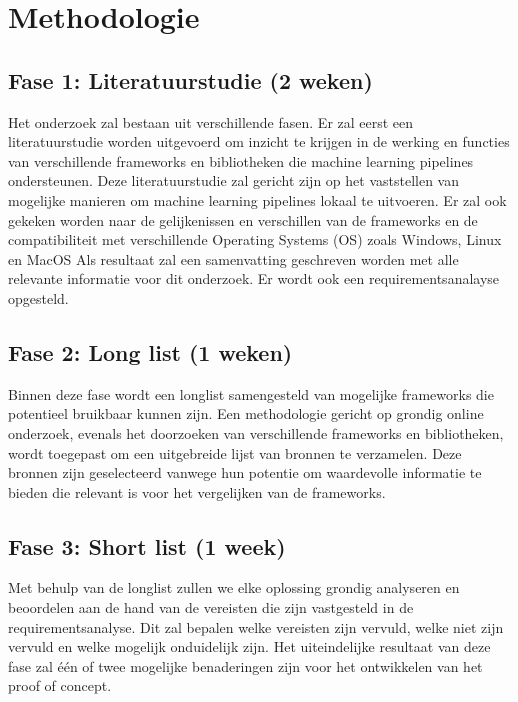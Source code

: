 

\section{Methodologie}%
\label{sec:methodologie}

\subsection{Fase 1: Literatuurstudie (2 weken)}
Het onderzoek zal bestaan uit verschillende fasen. Er zal eerst een literatuurstudie worden uitgevoerd om inzicht te krijgen in de werking en
functies van verschillende frameworks en bibliotheken die machine learning pipelines ondersteunen.
Deze literatuurstudie zal gericht zijn op het vaststellen van mogelijke manieren om machine learning pipelines lokaal te uitvoeren. Er zal ook gekeken worden naar de gelijkenissen en verschillen van de frameworks en de compatibiliteit met verschillende Operating Systems (OS) zoals Windows, Linux en MacOS
Als resultaat zal een samenvatting geschreven worden met alle relevante informatie voor dit onderzoek.
Er wordt ook een requirementsanalayse opgesteld.\\
\subsection{Fase 2: Long list (1 weken)}
Binnen deze fase wordt een longlist samengesteld van mogelijke frameworks die potentieel bruikbaar kunnen zijn. Een methodologie gericht op grondig online onderzoek, evenals het doorzoeken van verschillende frameworks en bibliotheken, wordt toegepast om een uitgebreide lijst van bronnen te verzamelen. Deze bronnen zijn geselecteerd vanwege hun potentie om waardevolle informatie te bieden die relevant is voor het vergelijken van de frameworks.
\subsection{Fase 3: Short list (1 week)}
Met behulp van de longlist zullen we elke oplossing grondig analyseren en beoordelen aan de hand van de vereisten die zijn vastgesteld in de requirementsanalyse. Dit zal bepalen welke vereisten zijn vervuld, welke niet zijn vervuld en welke mogelijk onduidelijk zijn. Het uiteindelijke resultaat van deze fase zal één of twee mogelijke benaderingen zijn voor het ontwikkelen van het proof of concept.
